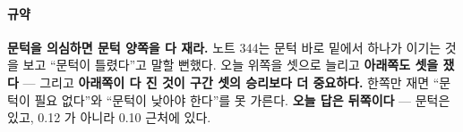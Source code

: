 \documentclass[10pt]{article}
\begin{document}
\paragraph{규약} \textbf{문턱을 의심하면 문턱 양쪽을 다 재라.} 노트 344는
문턱 바로 밑에서 하나가 이기는 것을 보고 ``문턱이 틀렸다''고 말할 뻔했다.
오늘 위쪽을 셋으로 늘리고 \textbf{아래쪽도 셋을 쟀다} --- 그리고
\textbf{아래쪽이 다 진 것이 구간 셋의 승리보다 더 중요하다.} 한쪽만 재면
``문턱이 필요 없다''와 ``문턱이 낮아야 한다''를 못 가른다. \textbf{오늘
답은 뒤쪽이다} --- 문턱은 있고, 0.12 가 아니라 0.10 근처에 있다.
\end{document}
